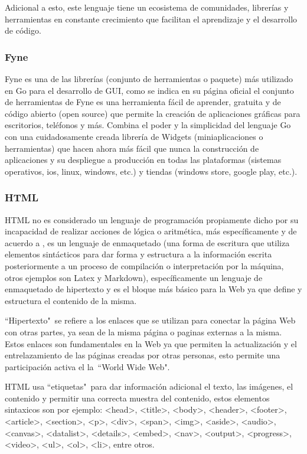 Adicional a esto, este lenguaje tiene un ecosistema de comunidades, librerías y
herramientas en constante crecimiento que facilitan el aprendizaje y el desarrollo
de código.

\subsubsection{Fyne}

Fyne es una de las librerías (conjunto de herramientas o paquete) más utilizado
en Go para el desarrollo de GUI, como se indica en su página oficial \textcite{fyne}
el conjunto de herramientas de Fyne es una herramienta fácil de aprender, gratuita
y de código abierto (open source) que permite la creación de aplicaciones gráficas
para escritorios, teléfonos y más. Combina el poder y la simplicidad del lenguaje
Go con una cuidadosamente creada librería de Widgets (miniaplicaciones o herramientas)
que hacen ahora más fácil que nunca la construcción de aplicaciones y su despliegue
a producción en todas las plataformas (sistemas operativos, ios, linux, windows, etc.)
y tiendas (windows store, google play, etc.).

\subsubsection{HTML}

HTML no es considerado un lenguaje de programación propiamente dicho por su
incapacidad de realizar acciones de lógica o aritmética, más específicamente y
de acuerdo a \textcite{HTML},
es un lenguaje de enmaquetado (una forma de escritura que utiliza elementos
sintácticos para dar forma y estructura a la información escrita posteriormente
a un proceso de  compilación o interpretación por la máquina, otros ejemplos son
Latex y Markdown), específicamente un lenguaje de enmaquetado de hipertexto y es
el bloque más básico para la Web ya que define y estructura el contenido de la
misma.

``Hipertexto"\  se refiere a los enlaces que se utilizan para conectar la página
Web con otras partes, ya sean de la misma página o paginas externas a la misma.
Estos enlaces son fundamentales en la Web ya que permiten la actualización y el
entrelazamiento de las páginas creadas por otras personas, esto permite
una participación activa el la\  ``World Wide Web".

HTML usa ``etiquetas"\  para dar información adicional  el texto, las imágenes,
el contenido y permitir
una correcta muestra del contenido, estos elementos sintaxicos son por ejemplo:
 <head>, <title>, <body>, <header>, <footer>, <article>, <section>, <p>, <div>,
 <span>, <img>, <aside>, <audio>, <canvas>, <datalist>, <details>, <embed>,
 <nav>, <output>, <progress>, <video>, <ul>, <ol>, <li>, entre otros.

